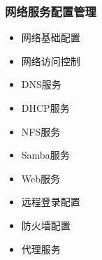 \documentclass[xcolor=svgnames,bigger,presentation]{beamer}
\begin{document}
\begin{frame}
\frametitle{网络服务配置管理}
\label{sec-1-2-4}
\begin{itemize}

\item 网络基础配置
\label{sec-1-2-4-1}%

\item 网络访问控制
\label{sec-1-2-4-2}%

\item DNS服务
\label{sec-1-2-4-3}%

\item DHCP服务
\label{sec-1-2-4-4}%

\item NFS服务
\label{sec-1-2-4-5}%

\item Samba服务
\label{sec-1-2-4-6}%

\item Web服务
\label{sec-1-2-4-7}%

\item 远程登录配置
\label{sec-1-2-4-8}%

\item 防火墙配置
\label{sec-1-2-4-9}%

\item 代理服务
\label{sec-1-2-4-10}%
\end{itemize} %
\end{frame}
\end{document}
